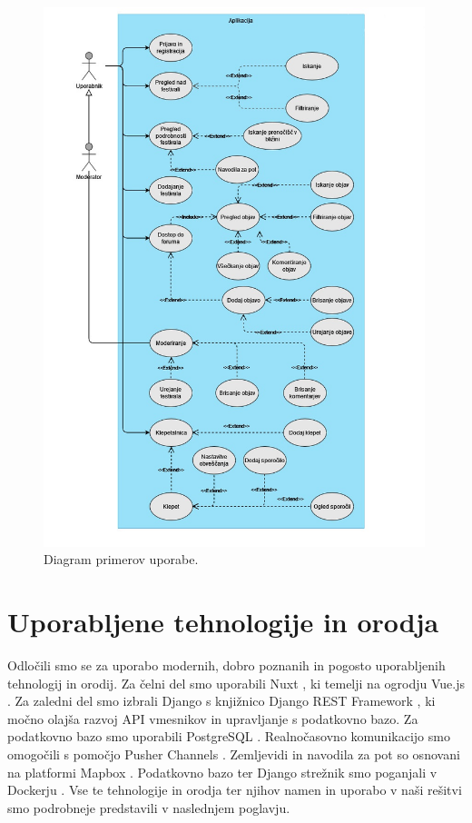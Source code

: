 \documentclass[a4paper,12pt,openright]{book}
\begin{document}
\begin{figure}[p] %
\begin{center}
    \includegraphics[width=0.99\textwidth]{img/UseCase}
\end{center}
\caption{Diagram primerov uporabe.}
\label{usecase}
\end{figure}

\chapter{Uporabljene tehnologije in orodja}
Odločili smo se za uporabo modernih, dobro poznanih in pogosto uporabljenih tehnologij in orodij. Za čelni del smo uporabili
Nuxt \cite{nuxtintro}, ki temelji na ogrodju Vue.js \cite{vuejs}. Za zaledni del smo izbrali Django \cite{django} s knjižnico Django REST Framework \cite{drf}, 
ki močno olajša razvoj API vmesnikov in upravljanje s podatkovno bazo. Za podatkovno bazo smo uporabili PostgreSQL \cite{postgre}.
Realnočasovno komunikacijo smo omogočili s pomočjo Pusher Channels \cite{pusher}. Zemljevidi 
in navodila za pot so osnovani na platformi Mapbox \cite{mapbox}. Podatkovno bazo ter Django strežnik smo poganjali v Dockerju \cite{docker}.
Vse te tehnologije in orodja ter njihov namen in uporabo v naši rešitvi smo podrobneje predstavili v naslednjem poglavju.
\end{document}
